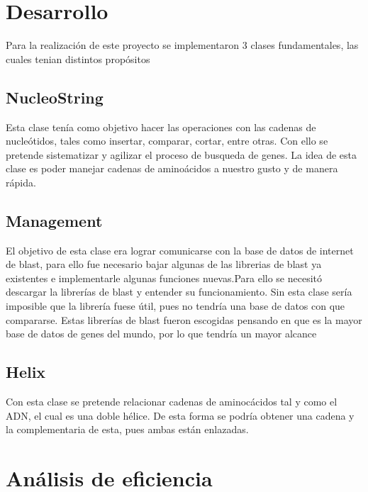 \documentclass[10pt,a4paper,spanish] {article}
\begin{document}
\section{Desarrollo}
Para la realización de este proyecto se implementaron 3 clases fundamentales, las cuales tenian distintos propósitos 


\subsection{NucleoString}
	Esta clase tenía como objetivo hacer las operaciones con las cadenas de nucleótidos, tales como insertar, comparar, cortar, entre otras. 
	Con ello se pretende sistematizar y agilizar el proceso de busqueda de genes. La idea de esta clase es poder manejar cadenas de aminoácidos a nuestro gusto y de manera rápida.
	
\subsection{Management}
	El objetivo de esta clase era lograr comunicarse con la base de datos de internet de blast, para ello fue necesario bajar algunas de las librerias de blast ya existentes e implementarle algunas funciones nuevas.Para ello se necesitó descargar la librerías de blast y entender su funcionamiento. Sin esta clase sería imposible que la librería fuese útil, pues no tendría una base de datos con que compararse. Estas librerías de blast fueron escogidas pensando en que es la mayor base de datos de genes del mundo, por lo que tendría un mayor alcance
	
\subsection{Helix}
	Con esta clase se pretende relacionar cadenas de aminocácidos tal y como el ADN, el cual es una doble hélice. De esta forma se podría obtener una cadena y la complementaria de esta, pues ambas están enlazadas. 

\section{Análisis de eficiencia}
\end{document}
